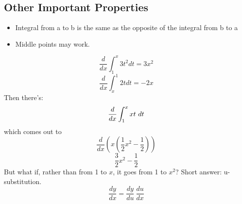 \message{ !name(unit1.tex)}\documentclass[11pt]{article}
\begin{document}
    \subsection{Other Important Properties}
    \begin{itemize}
      \item Integral from a to b is the same as the opposite of the integral from
        b to a
      \item Middle points may work.
    \end{itemize}
    \[
        \frac{d}{dx} \int_{1}^{x}3t^2dt = 3x^2
    \]
    \[
        \frac{d}{dx}\int_{x}^{1}2tdt = -2x
    \]
    Then there's:
    \[
        \frac{d}{dx}\int_{1}^{x}xt\ dt \\
    \]
    which comes out to
    \[
        \frac{d}{dx}\left(x\left(\frac{1}{2} x^2 - \frac{1}{2}\right)\right)
    \]
    \[
        \frac{3}{2}x^2-\frac{1}{2}
    \]
    But what if, rather than from 1 to $x$, it goes from 1 to $x^2$?  Short
    answer: u-substitution.
    \[
        \frac{dy}{dx} = \frac{dy}{du}\  \frac{du}{dx}
    \]
\end{document}
